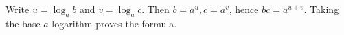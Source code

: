 Write $u=\log_ab$ and $v=\log_ac$. Then $b=a^u,c=a^v$, hence $bc=a^{u+v}$. Taking the base-$a$ logarithm proves the formula.
